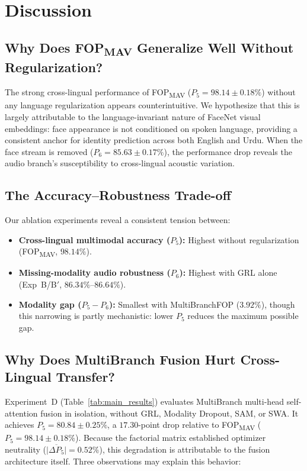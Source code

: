 \documentclass[conference]{IEEEtran}
\newcommand{\fopmav}{FOP\textsubscript{MAV}}
\begin{document}
\section{Discussion}
\label{sec:discussion}

\subsection{Why Does \fopmav{} Generalize Well Without Regularization?}

The strong cross-lingual performance of \fopmav{} ($P_5 = 98.14 \pm 0.18\%$) without
any language regularization appears counterintuitive. We hypothesize that this
is largely attributable to the language-invariant nature of FaceNet visual
embeddings: face appearance is not conditioned on spoken language, providing a
consistent anchor for identity prediction across both English and Urdu.
When the face stream is removed ($P_6 = 85.63 \pm 0.17\%$), the performance drop
reveals the audio branch's susceptibility to cross-lingual acoustic variation.

\subsection{The Accuracy--Robustness Trade-off}

Our ablation experiments reveal a consistent tension between:
\begin{itemize}
    \item \textbf{Cross-lingual multimodal accuracy ($P_5$):} Highest without
    regularization (\fopmav{}, $98.14\%$).
    \item \textbf{Missing-modality audio robustness ($P_6$):} Highest with GRL
    alone (Exp~B/B$'$, $86.34\%$--$86.64\%$).
    \item \textbf{Modality gap ($P_5 - P_6$):} Smallest with MultiBranchFOP
    ($3.92\%$), though this narrowing is partly mechanistic: lower $P_5$
    reduces the maximum possible gap.
\end{itemize}

\subsection{Why Does MultiBranch Fusion Hurt Cross-Lingual Transfer?}

Experiment~D (Table~\ref{tab:main_results}) evaluates MultiBranch multi-head
self-attention fusion in isolation, without GRL, Modality Dropout, SAM, or SWA.
It achieves $P_5 = 80.84 \pm 0.25\%$, a $17.30$-point drop relative to
\fopmav{} ($P_5 = 98.14 \pm 0.18\%$).
Because the factorial matrix established optimizer neutrality
($\overline{|\Delta P_5|} = 0.52\%$), this degradation is attributable to
the fusion architecture itself.
Three observations may explain this behavior:
\end{document}
